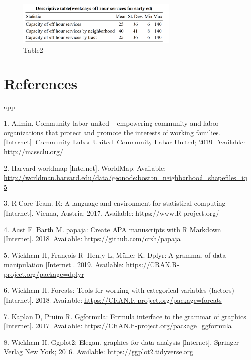 \documentclass[10pt,letterpaper]{article}
\begin{document}
\begin{figure}
\centering
\includegraphics[width=3.12500in]{table2.png}
\caption{Table2}
\end{figure}

\section{References}\label{references.unumbered}

app

\hypertarget{refs}{}
\hypertarget{ref-admin_2019}{}
1. Admin. Community labor united -- empowering community and labor
organizations that protect and promote the interests of working
families. {[}Internet{]}. Community Labor United. Community Labor
United; 2019. Available: \url{http://massclu.org/}

\hypertarget{ref-worldmap}{}
2. Harvard worldmap {[}Internet{]}. WorldMap. Available:
\url{http://worldmap.harvard.edu/data/geonode:boston_neighborhood_shapefiles_iq5}

\hypertarget{ref-R-base}{}
3. R Core Team. R: A language and environment for statistical computing
{[}Internet{]}. Vienna, Austria; 2017. Available:
\url{https://www.R-project.org/}

\hypertarget{ref-R-papaja}{}
4. Aust F, Barth M. papaja: Create APA manuscripts with R Markdown
{[}Internet{]}. 2018. Available: \url{https://github.com/crsh/papaja}

\hypertarget{ref-R-dplyr}{}
5. Wickham H, François R, Henry L, Müller K. Dplyr: A grammar of data
manipulation {[}Internet{]}. 2019. Available:
\url{https://CRAN.R-project.org/package=dplyr}

\hypertarget{ref-R-forcats}{}
6. Wickham H. Forcats: Tools for working with categorical variables
(factors) {[}Internet{]}. 2018. Available:
\url{https://CRAN.R-project.org/package=forcats}

\hypertarget{ref-R-ggformula}{}
7. Kaplan D, Pruim R. Ggformula: Formula interface to the grammar of
graphics {[}Internet{]}. 2017. Available:
\url{https://CRAN.R-project.org/package=ggformula}

\hypertarget{ref-R-ggplot2}{}
8. Wickham H. Ggplot2: Elegant graphics for data analysis
{[}Internet{]}. Springer-Verlag New York; 2016. Available:
\url{https://ggplot2.tidyverse.org}
\end{document}
